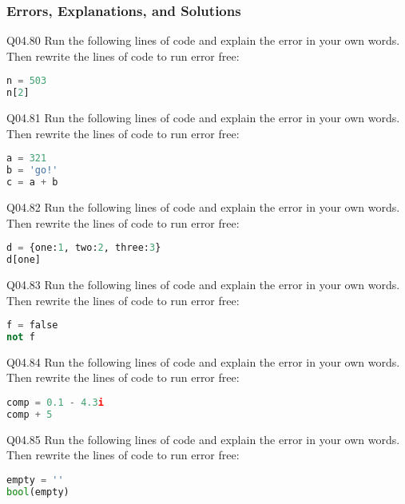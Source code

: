 \documentclass{book}
\newenvironment{problems}{}{}  %
\begin{document}
    
        \begin{problems}
        \hypertarget{errors-explanations-and-solutions}{%
\subsubsection{Errors, Explanations, and
Solutions}\label{errors-explanations-and-solutions}}

Q04.80 Run the following lines of code and explain the error in your own
words. Then rewrite the lines of code to run error free:

\begin{lstlisting}[language=Python]
n = 503
n[2]
\end{lstlisting}

Q04.81 Run the following lines of code and explain the error in your own
words. Then rewrite the lines of code to run error free:

\begin{lstlisting}[language=Python]
a = 321
b = 'go!'
c = a + b
\end{lstlisting}

Q04.82 Run the following lines of code and explain the error in your own
words. Then rewrite the lines of code to run error free:

\begin{lstlisting}[language=Python]
d = {one:1, two:2, three:3}
d[one]
\end{lstlisting}

Q04.83 Run the following lines of code and explain the error in your own
words. Then rewrite the lines of code to run error free:

\begin{lstlisting}[language=Python]
f = false
not f
\end{lstlisting}

Q04.84 Run the following lines of code and explain the error in your own
words. Then rewrite the lines of code to run error free:

\begin{lstlisting}[language=Python]
comp = 0.1 - 4.3i
comp + 5
\end{lstlisting}

Q04.85 Run the following lines of code and explain the error in your own
words. Then rewrite the lines of code to run error free:

\begin{lstlisting}[language=Python]
empty = ''
bool(empty)
\end{lstlisting}


\end{problems}
\end{document}
